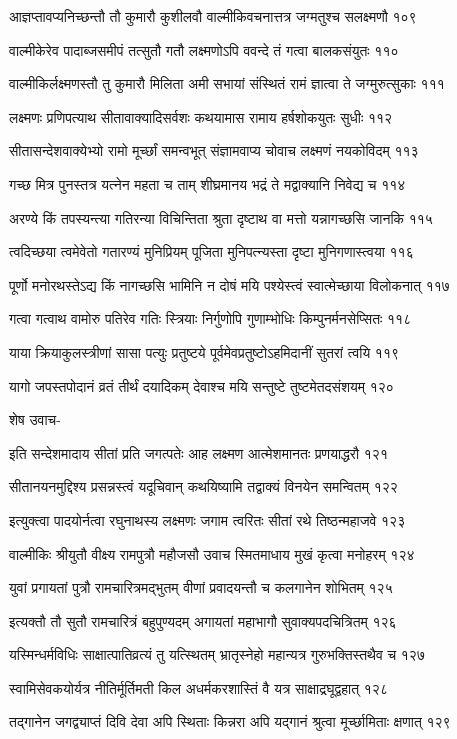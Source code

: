 आज्ञप्तावप्यनिच्छन्तौ तौ कुमारौ कुशीलवौ
वाल्मीकिवचनात्तत्र जग्मतुश्च सलक्ष्मणौ १०९

वाल्मीकेरेव पादाब्जसमीपं तत्सुतौ गतौ
लक्ष्मणोऽपि ववन्दे तं गत्वा बालकसंयुतः ११०

वाल्मीकिर्लक्ष्मणस्तौ तु कुमारौ मिलिता अमी
सभायां संस्थितं रामं ज्ञात्वा ते जग्मुरुत्सुकाः १११

लक्ष्मणः प्रणिपत्याथ सीतावाक्यादिसर्वशः
कथयामास रामाय हर्षशोकयुतः सुधीः ११२

सीतासन्देशवाक्येभ्यो रामो मूर्च्छां समन्वभूत्
संज्ञामवाप्य चोवाच लक्ष्मणं नयकोविदम् ११३

गच्छ मित्र पुनस्तत्र यत्नेन महता च ताम्
शीघ्रमानय भद्रं ते मद्वाक्यानि निवेद्य च ११४

अरण्ये किं तपस्यन्त्या गतिरन्या विचिन्तिता
श्रुता दृष्टाथ वा मत्तो यन्नागच्छसि जानकि ११५

त्वदिच्छया त्वमेवेतो गतारण्यं मुनिप्रियम्
पूजिता मुनिपत्न्यस्ता दृष्टा मुनिगणास्त्वया ११६

पूर्णो मनोरथस्तेऽद्य किं नागच्छसि भामिनि
न दोषं मयि पश्येस्त्वं स्वात्मेच्छाया विलोकनात् ११७

गत्वा गत्वाथ वामोरु पतिरेव गतिः स्त्रियाः
निर्गुणोपि गुणाम्भोधिः किम्पुनर्मनसेप्सितः ११८

याया क्रियाकुलस्त्रीणां सासा पत्युः प्रतुष्टये
पूर्वमेवप्रतुष्टोऽहमिदानीं सुतरां त्वयि ११९

यागो जपस्तपोदानं व्रतं तीर्थं दयादिकम्
देवाश्च मयि सन्तुष्टे तुष्टमेतदसंशयम् १२०

शेष उवाच-

इति सन्देशमादाय सीतां प्रति जगत्पतेः
आह लक्ष्मण आत्मेशमानतः प्रणयाद्धरौ १२१

सीतानयनमुद्दिश्य प्रसन्नस्त्वं यदूचिवान्
कथयिष्यामि तद्वाक्यं विनयेन समन्वितम् १२२

इत्युक्त्वा पादयोर्नत्वा रघुनाथस्य लक्ष्मणः
जगाम त्वरितः सीतां रथे तिष्ठन्महाजवे १२३

वाल्मीकिः श्रीयुतौ वीक्ष्य रामपुत्रौ महौजसौ
उवाच स्मितमाधाय मुखं कृत्वा मनोहरम् १२४

युवां प्रगायतां पुत्रौ रामचारित्रमद्भुतम्
वीणां प्रवादयन्तौ च कलगानेन शोभितम् १२५

इत्यक्तौ तौ सुतौ रामचारित्रं बहुपुण्यदम्
अगायतां महाभागौ सुवाक्यपदचित्रितम् १२६

यस्मिन्धर्मविधिः साक्षात्पातिव्रत्यं तु यत्स्थितम्
भ्रातृस्नेहो महान्यत्र गुरुभक्तिस्तथैव च १२७

स्वामिसेवकयोर्यत्र नीतिर्मूर्तिमती किल
अधर्मकरशास्तिं वै यत्र साक्षाद्रघूद्वहात् १२८

तद्गानेन जगद्व्याप्तं दिवि देवा अपि स्थिताः
किन्नरा अपि यद्गानं श्रुत्वा मूर्च्छामिताः क्षणात् १२९

